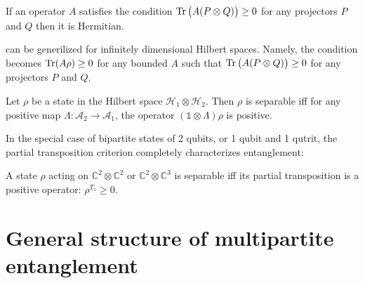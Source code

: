 \documentclass[12pt]{report}
\begin{document}
\begin{remark}
	If an operator $A$ satisfies the condition $\Tr\big( A(P \otimes Q) \big) \ge 0$
	for any projectors $P$ and $Q$ then it is Hermitian.
\end{remark}

\begin{remark}
	 can be generilized for infinitely dimensional Hilbert spaces.
	Namely, the condition becomes $\Tr(A\rho) \ge 0$ for any bounded $A$ such that
	$\Tr\big( A(P\otimes Q) \big) \ge 0$ for any projectors $P$ and $Q$.
\end{remark}

\begin{thm}
	Let $\rho$ be a state in the Hilbert space $\mathcal H_1 \otimes \mathcal H_2$.
	Then $\rho$ is separable iff for any positive map
	$\Lambda : \mathcal A_2 \to \mathcal A_1$,
	the operator $(\mathds1 \otimes \Lambda)\rho$ is positive.
\end{thm}

In the special case of bipartite states of 2 qubits, or 1 qubit and 1 qutrit,
the partial transposition criterion completely characterizes entanglement:
\begin{thm}
	A state $\rho$ acting on $\mathbb C^2 \otimes \mathbb C^2$
	or $\mathbb C^2 \otimes \mathbb C^3$ is separable iff
	its partial transposition is a positive operator: $\rho^{T_1} \ge 0$.
\end{thm}


\section{General structure of multipartite entanglement}
\end{document}

